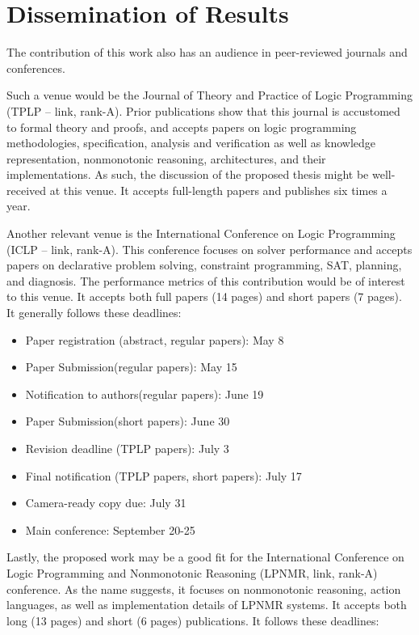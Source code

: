 \section{Dissemination of Results}

The contribution of this work also has an audience in peer-reviewed journals and conferences.

Such a venue would be the Journal of Theory and Practice of Logic Programming (TPLP – link, rank-A).
Prior publications show that this journal is accustomed to formal theory and proofs, and accepts papers on logic programming methodologies, specification, analysis and verification as well as knowledge representation, nonmonotonic reasoning, architectures, and their implementations.
As such, the discussion of the proposed thesis might be well-received at this venue.
It accepts full-length papers and publishes six times a year.

Another relevant venue is the International Conference on Logic Programming (ICLP – link, rank-A).
This conference focuses on solver performance and accepts papers on declarative problem solving, constraint programming, SAT, planning, and diagnosis.
The performance metrics of this contribution would be of interest to this venue.
It accepts both full papers (14 pages) and short papers (7 pages).
It generally follows these deadlines:

\begin{itemize}
    \item Paper registration (abstract, regular papers): May 8
    \item Paper Submission(regular papers): May 15
    \item Notification to authors(regular papers): June 19
    \item Paper Submission(short papers): June 30
    \item Revision deadline (TPLP papers): July 3
    \item Final notification (TPLP papers, short papers): July 17
    \item Camera-ready copy due: July 31
    \item Main conference: September 20-25
\end{itemize}

Lastly, the proposed work may be a good fit for the International Conference on Logic Programming and Nonmonotonic Reasoning (LPNMR, link, rank-A) conference.
As the name suggests, it focuses on nonmonotonic reasoning, action languages, as well as implementation details of LPNMR systems.
It accepts both long (13 pages) and short (6 pages) publications.
It follows these deadlines:

